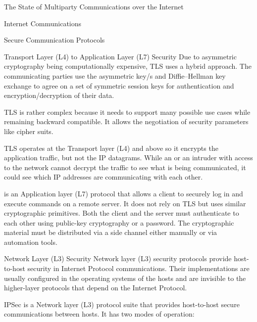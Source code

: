 \begin{frame}[fragile]{The State of Multiparty Communications over the
Internet}
\begin{block}{Internet Communications}
\begin{block}{Secure Communication Protocols}
\begin{block}{Transport Layer (L4) to Application Layer (L7) Security}
Due to asymmetric cryptography being computationally expensive, TLS uses
a hybrid approach. The communicating parties use the asymmetric key/s
and Diffie--Hellman key exchange to agree on a set of symmetric session
keys for authentication and encryption/decryption of their data.

TLS is rather complex because it needs to support many possible use
cases while remaining backward compatible. It allows the negotiation of
security parameters like cipher suits.

TLS operates at the Transport layer (L4) and above so it encrypts the
application traffic, but not the IP datagrams. While an  or an
intruder with access to the network cannot decrypt the traffic to see
what is being communicated, it could see which IP addresses are
communicating with each other.

 is an Application layer (L7) protocol that allows a client to
securely log in and execute commands on a remote server. It does not
rely on TLS but uses similar cryptographic primitives. Both the client
and the server must authenticate to each other using public-key
cryptography or a password. The cryptographic material must be
distributed via a side channel either manually or via automation tools.
\end{block}

\begin{block}{Network Layer (L3) Security}
\protect\hypertarget{network-layer-l3-security}{}
Network layer (L3) security protocols provide host-to-host security in
Internet Protocol communications. Their implementations are usually
configured in the operating systems of the hosts and are invisible to
the higher-layer protocols that depend on the Internet Protocol.

\begin{block}{IPSec}
\protect\hypertarget{ipsec}{}
 is a Network layer (L3) protocol suite that provides
host-to-host secure communications between  hosts. It has two
modes of operation:


\end{block}
\end{block}
\end{block}
\end{block}
\end{frame}
